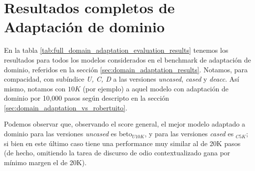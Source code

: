 \chapter{Resultados completos de Adaptación de dominio}

En la tabla \ref{tab:full_domain_adaptation_evaluation_results} tenemos los resultados para todos los modelos considerados en el benchmark de adaptación de dominio, referidos en la sección \ref{sec:domain_adaptation_results}. Notamos, para compacidad, con subíndice \emph{U, C, D} a las versiones  \emph{uncased}, \emph{cased} y \emph{deacc}. Así mismo, notamos con $10K$ (por ejemplo) a aquel modelo con adaptación de dominio por 10,000 pasos según descripto en la sección \ref{sec:domain_adaptation_vs_robertuito}.

Podemos observar que, observando el score general, el mejor modelo adaptado a dominio para las versiones \emph{uncased} es beto$_{U10K}$, y para las versiones \emph{cased} es \beto{}$_{C5K}$; si bien en este último caso tiene una performance muy similar al de 20K pasos (de hecho, omitiendo la tarea de discurso de odio contextualizado gana por mínimo margen el de 20K).

